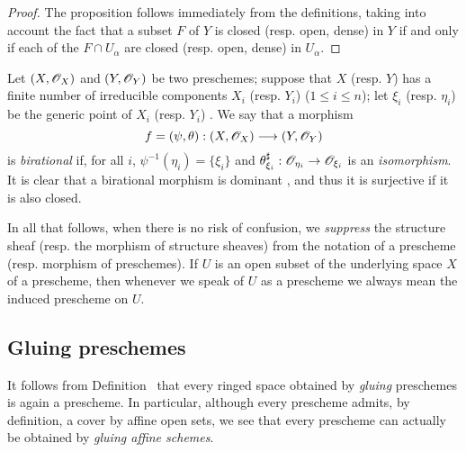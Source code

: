\begin{proof}
\label{proof-I.2.2.8}
The proposition follows immediately from the definitions, taking into account the fact that a subset $F$ of $Y$ is closed (resp. open, dense) in $Y$ if and only if each of the $F\cap U_\alpha$ are closed (resp. open, dense) in $U_\alpha$.
\end{proof}

\begin{env}[2.2.9]
\label{I.2.2.9}
Let $(X,\mathscr{O}_X)$ and $(Y,\mathscr{O}_Y)$ be two preschemes;
suppose that $X$ (resp. $Y$) has a finite number of irreducible components $X_i$ (resp. $Y_i$) ($1\leq i\leq n$);
let $\xi_i$ (resp. $\eta_i$) be the generic point of $X_i$ (resp. $Y_i$) .
We say that a morphism
\[
  f=(\psi,\theta):(X,\sh{O}_X)\to(Y,\sh{O}_Y)
\]
is \emph{birational} if, for all $i$, $\psi^{-1}(\eta_i)=\{\xi_i\}$ and $\theta_{\xi_i}^\sharp:\sh{O}_{\eta_i}\to\sh{O}_{\xi_i}$ is an \emph{isomorphism}.
It is clear that a birational morphism is dominant , and thus it is surjective if it is also closed.
\end{env}

\begin{notation}[2.2.10]
\label{I.2.2.10}
In all that follows, when there is no risk of confusion, we \emph{suppress} the structure sheaf (resp. the morphism of structure sheaves) from the notation of a prescheme (resp. morphism of preschemes).
If $U$ is an open subset of the underlying space $X$ of a prescheme, then whenever we speak of $U$ as a prescheme we always mean the induced prescheme on $U$.
\end{notation}

\subsection{Gluing preschemes}
\label{subsection:I.2.3}

\begin{env}[2.3.1]
\label{I.2.3.1}
It follows from Definition~ that every ringed space obtained by \emph{gluing} preschemes  is again a prescheme.
In particular, although every prescheme admits, by definition, a cover by affine open sets, we see that every prescheme can actually be obtained by \emph{gluing affine schemes}.
\end{env}

